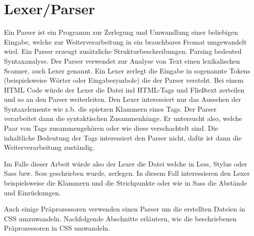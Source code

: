 \section{Lexer/Parser}
Ein Parser ist ein Programm zur Zerlegung und Umwandlung einer beliebigen Eingabe, welche zur Weiterverarbeitung in ein brauchbares Fromat umgewandelt wird. Ein Parser erzeugt zusätzliche Strukturbeschreibungen. Parsing bedeuted Syntaxanalyse. \newline
Der Parser verwendet zur Analyse von Text einen lexikalischen Scanner, auch Lexer genannt. Ein Lexer zerlegt die Eingabe in sogenannte Tokens (beispielsweise Wörter oder Eingabesymbole) die der Parser versteht. \newline
Bei einem HTML Code würde der Lexer die Datei ind HTML-Tags und Fließtext zerteilen und so an den Parser weiterleiten. Den Lexer interessiert nur das Aussehen der Syntaxelemente wie z.b. die spietzen Klammern eines Tags. Der Parser verarbeitet dann die syntaktischen Zusammenhänge. Er untersucht also, welche Paar von Tags zusammengehören oder wie diese verschachtelt sind. Die inhaltliche Bedeutung der Tags interessiert den Parser nicht, dafür ist dann die Weiterverarbeitung zuständig.

Im Falle dieser Arbeit würde also der Lexer die Datei welche in Less, Stylus oder Sass bzw. Scss geschrieben wurde, zerlegen. In diesem Fall interessieren den Lexer beispielsweise die Klammern und die Strichpunkte oder wie in Sass die Abstände und Einrückungen.

Auch einige Präprozessoren verwenden einen Parser um die erstellten Dateien in CSS umzuwandeln. Nachfolgende Abschnitte erläutern, wie die beschriebenen Präprozessoren in CSS umwandeln. 

